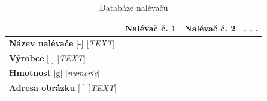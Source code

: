 \begin{table} [H]
    \centering
    \begin{tabular}{|l|l|l|l|}
    \hline
         & Nalévač č. 1 & Nalévač č. 2 &  . . .\\ \hline
         \textbf{Název nalévače} [-] [\textit{TEXT}] & & &\\ \hline
         \textbf{Výrobce} [-] [\textit{TEXT}] & & &\\ \hline
         \textbf{Hmotnost} [g] [\textit{numeric}] & & &\\ \hline
         \textbf{Adresa obrázku} [-] [\textit{TEXT}] & & &\\ \hline
    \end{tabular}
    \caption{Databáze nalévačů}
    \label{tab:my_label}
\end{table}


